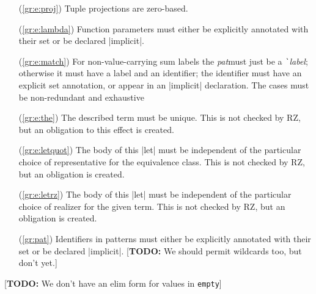 \documentclass[11pt]{article}
\newcommand{\metav}[1]{\mbox{\textit{#1}}}
\newcommand{\Label}{\metav{\texttt{\`}label}}
\newcommand{\Pat}{\metav{pat}}
\newcommand{\TODO}[1]{[\textbf{TODO: }#1]}
\begin{document}
\begin{itemize}
	\item[(\ref{gr:e:proj})] Tuple projections are zero-based.
	\item[(\ref{gr:e:lambda})] Function parameters must either be explicitly annotated with their set or be declared |implicit|.
	\item[(\ref{gr:e:match})]
  For non-value-carrying
  sum labels the \Pat must just be a \Label; otherwise it must have a label and an identifier; the identifier must have an explicit set annotation, or appear in an |implicit| declaration.  The cases must be non-redundant
  and exhaustive
	\item[(\ref{gr:e:the})] The described term must be unique.  This is not checked by RZ, but an obligation to this effect is created. 
	\item[(\ref{gr:e:letquot})] The body of this |let| must be independent of the particular choice of representative for the equivalence class.  This is not checked by RZ, but an obligation is created.
	\item[(\ref{gr:e:letrz})] The body of this |let| must be independent of the particular choice of realizer for the given term.  This is not checked by RZ, but an obligation is created.
	\item[(\ref{gr:pat})] Identifiers in patterns must either be explicitly annotated with their set or be declared |implicit|.
	\TODO{We should permit wildcards too, but don't yet.}
\end{itemize}

\TODO{We don't have an elim form for values in \texttt{empty}}
\end{document}
